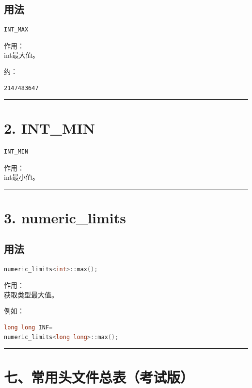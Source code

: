 \documentclass[10pt,twocolumn]{extarticle}
\begin{document}
\subsection{用法}
\begin{lstlisting}[language=C++]
INT_MAX
\end{lstlisting}
作用：\\
int最大值。

约：
\begin{lstlisting}
2147483647
\end{lstlisting}

\noindent\rule{\linewidth}{0.4pt}

\section{2. INT\_MIN}
\begin{lstlisting}[language=C++]
INT_MIN
\end{lstlisting}
作用：\\
int最小值。

\noindent\rule{\linewidth}{0.4pt}

\section{3. numeric\_limits}

\subsection{用法}
\begin{lstlisting}[language=C++]
numeric_limits<int>::max();
\end{lstlisting}
作用：\\
获取类型最大值。

例如：
\begin{lstlisting}[language=C++]
long long INF=
numeric_limits<long long>::max();
\end{lstlisting}

\noindent\rule{\linewidth}{0.4pt}

\section{七、常用头文件总表（考试版）}
\end{document}
